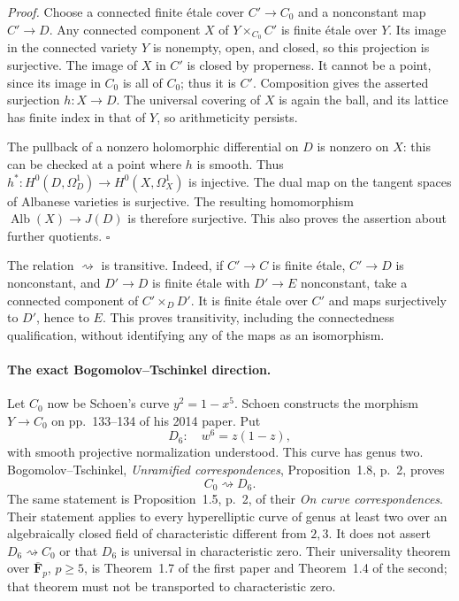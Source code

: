 \documentclass[11pt]{article}
\theoremstyle{definition}\newtheorem{definition}[theorem]{Definition}\newtheorem{remark}[theorem]{Remark}
\begin{document}
\emph{Proof.}
Choose a connected finite \'{e}tale cover $C'\to C_0$ and a nonconstant
map $C'\to D$.  Any connected component $X$ of $Y\times_{C_0}C'$ is finite
\'{e}tale over $Y$.  Its image in the connected variety $Y$ is nonempty,
open, and closed, so this projection is surjective.  The image of $X$ in
$C'$ is closed by properness.  It cannot be a point, since its image in
$C_0$ is all of $C_0$; thus it is $C'$.  Composition gives the asserted
surjection $h:X\to D$.  The universal covering of $X$ is again the ball,
and its lattice has finite index in that of $Y$, so arithmeticity persists.

The pullback of a nonzero holomorphic differential on $D$ is nonzero on
$X$: this can be checked at a point where $h$ is smooth.  Thus
$h^*:H^0(D,\Omega_D^1)\to H^0(X,\Omega_X^1)$ is injective.  The dual map
on the tangent spaces of Albanese varieties is surjective.  The resulting
homomorphism $\operatorname{Alb}(X)\to J(D)$ is therefore surjective.
This also proves the assertion about further quotients. \hfill$\square$

The relation $\rightsquigarrow$ is transitive.  Indeed, if
$C'\to C$ is finite \'{e}tale, $C'\to D$ is nonconstant, and
$D'\to D$ is finite \'{e}tale with $D'\to E$ nonconstant, take a connected
component of $C'\times_DD'$.  It is finite \'{e}tale over $C'$ and maps
surjectively to $D'$, hence to $E$.  This proves transitivity, including the
connectedness qualification, without identifying any of the maps as an
isomorphism.

\paragraph{The exact Bogomolov--Tschinkel direction.}
Let $C_0$ now be Schoen's curve $y^2=1-x^5$.  Schoen constructs the morphism
$Y\to C_0$ on pp.~133--134 of his 2014 paper.  Put
\[
 D_6:\quad w^6=z(1-z),
\]
with smooth projective normalization understood.  This curve has genus two.
Bogomolov--Tschinkel, \emph{Unramified correspondences}, Proposition~1.8,
p.~2, proves
\[
 C_0\rightsquigarrow D_6.
\]
The same statement is Proposition~1.5, p.~2, of their
\emph{On curve correspondences}.  Their statement applies to every
hyperelliptic curve of genus at least two over an algebraically closed field
of characteristic different from $2,3$.  It does not assert
$D_6\rightsquigarrow C_0$ or that $D_6$ is universal in characteristic zero.
Their universality theorem over $\overline{\mathbf F}_p$, $p\geq5$, is
Theorem~1.7 of the first paper and Theorem~1.4 of the second; that theorem
must not be transported to characteristic zero.
\end{document}

